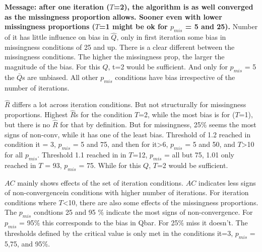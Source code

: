\documentclass[Royal,times,sageh]{sagej}
\begin{document}
\textbf{Message: after one iteration (\(T\)=2), the algorithm is as well converged as the missingness proportion allows. Sooner even with lower missingness proportions (\(T\)=1 might be ok for \(p_{mis}\) = 5 and 25).} Number of it has little influence on bias in \(\hat{Q}\), only in first iteration some bias in missingness conditions of 25 and up. There is a clear different between the missingness conditions. The higher the missingness prop, the larger the magnitude of the bias. For this \(Q\), t=2 would be sufficient. And only for \(p_{mis}\) = 5 the \(\bar{Q}\)s are unbiased. All other \(p_{mis}\) conditions have bias irrespective of the number of iterations.

\(\widehat{R}\) differs a lot across iteration conditions. But not structurally for missingness proportions. Highest \(\widehat{R}\)s for the condition \(T\)=2, while the most bias is for (\(T\)=1), but there is no \(\widehat{R}\) for that by definition. But for missingness, 25\% seems the most signs of non-conv, while it has one of the least bias. Threshold of 1.2 reached in condition it = 3, \(p_{mis}\) = 5 and 75, and then for it\textgreater6, \(p_{mis}\) = 5 and 50, and \(T\)\textgreater10 for all \(p_{mis}\). Threshold 1.1 reached in in \(T\)=12, \(p_{mis}\) = all but 75, 1.01 only reached in \(T\) = 93, \(p_{mis}\) = 75. While for this \(Q\), \(T\)=2 would be sufficient.

\(AC\) mainly shows effects of the set of iteration conditions. \(AC\) indicates less signs of non-convergencein conditions with higher number of iterations. For iteration conditions where \(T\)\textless10, there are also some effects of the missingness proportions. The \(p_{mis}\) condtions 25 and 95 \% indicate the most signs of non-convergence. For \(p_{mis}\) = 95\% this corresponds to the bias in Qbar. For 25\% miss it doesn't. The thresholds defined by the critical value is only met in the conditions it=3, \(p_{mis}\) = 5,75, and 95\%.
\end{document}
